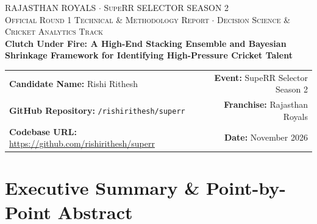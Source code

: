 \documentclass[11pt,a4paper]{article}
\begin{document}

\begin{center}
    \vspace*{-1.0cm}
    {\scshape\large RAJASTHAN ROYALS $\cdot$ SupeRR SELECTOR SEASON 2}\\[0.2cm]
    {\scshape\footnotesize Official Round 1 Technical & Methodology Report $\cdot$ Decision Science & Cricket Analytics Track}\\[0.6cm]
    
    {\LARGE\textbf{Clutch Under Fire: A High-End Stacking Ensemble and Bayesian Shrinkage Framework for Identifying High-Pressure Cricket Talent}}\\[0.6cm]
    
    \begin{tabularx}{0.95\linewidth}{X r}
        \toprule
        \textbf{Candidate Name:} Rishi Rithesh & \textbf{Event:} SupeRR Selector Season 2 \\
        \textbf{GitHub Repository:} \texttt{/rishirithesh/superr} & \textbf{Franchise:} Rajasthan Royals \\
        \textbf{Codebase URL:} \url{https://github.com/rishirithesh/superr} & \textbf{Date:} November 2026 \\
        \bottomrule
    \end{tabularx}
    \vspace{0.6cm}
\end{center}

\section*{Executive Summary \& Point-by-Point Abstract}
\end{document}

